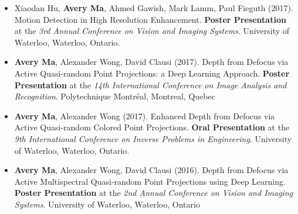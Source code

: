 \begin{adjustwidth}{\indentleft}{\indentright}
\begin{itemize}
    \item Xiaodan Hu, \textbf{Avery Ma}, Ahmed Gawish, Mark Lamm, Paul Fieguth (2017). Motion Detection in High Resolution Enhancement. \textbf{Poster Presentation} at the \emph{3rd Annual Conference on Vision and Imaging Systems}. University of Waterloo, Waterloo, Ontario.
    
    \item \textbf{Avery Ma}, Alexander Wong, David Clausi (2017). Depth from Defocus via Active Quasi-random Point Projections: a Deep Learning Approach. \textbf{Poster Presentation} at the \emph{14th International Conference on Image Analysis and Recognition}. Polytechnique Montréal, Montreal, Quebec
    
    \item \textbf{Avery Ma}, Alexander Wong (2017). Enhanced Depth from Defocus via Active Quasi-random Colored Point Projections. \textbf{Oral Presentation} at the \emph{9th International Conference on Inverse Problems in Engineering}. University of Waterloo, Waterloo, Ontario.
    
    \item \textbf{Avery Ma}, Alexander Wong, David Clausi (2016). Depth from Defocus via Active Multispectral Quasi-random Point Projections using Deep Learning. \textbf{Poster Presentation} at the \emph{2nd Annual Conference on Vision and Imaging Systems}. University of Waterloo, Waterloo, Ontario
\end{itemize}
\end{adjustwidth}
